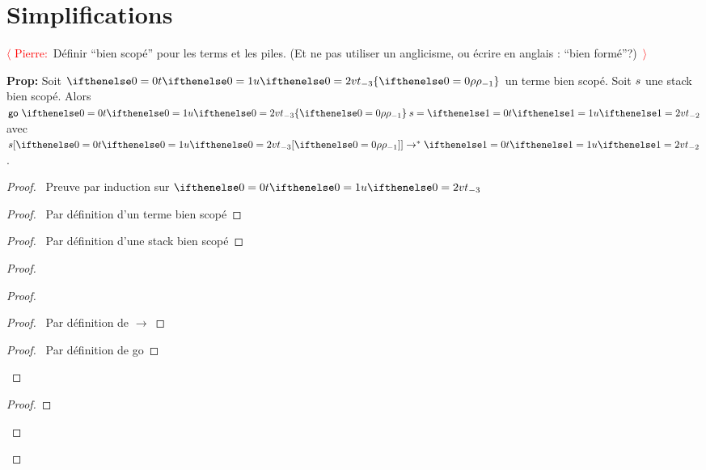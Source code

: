 \documentclass[a4paper]{article}
\newcommand{\TODO}[1]{\textcolor{red}{$\langle$ Pierre:}~#1\textcolor{red}{~$\rangle$}}
\begin{document}
\section{Simplifications}

\TODO{Définir ``bien scopé'' pour les terms et les piles. (Et ne pas utiliser un anglicisme, ou écrire en anglais : ``bien formé''?)}

\textbf{Prop:}
Soit $\scoped \aTerm \env$ un terme bien scopé. Soit $s$ une stack bien scopé.
Alors $\go {\scoped \aTerm \env} \aStack = \aTerm[1]$ avec $\stackapp \aStack {\subs \aTerm \env} \to^* \aTerm[1]$.
\begin{proof}
  \pfsketch\ Preuve par induction sur $\aTerm$
  \prove{$\stackapp \aStack {\subs \aTerm \env} \to^* \go {\scoped \aTerm \env} \aStack$ }
  \begin{proof}
    \pf\ Par définition d'un terme bien scopé
  \end{proof}
  \begin{proof}
    \pf\ Par définition d'une stack bien scopé
  \end{proof}
  \begin{proof}
    \begin{proof}
      \begin{proof}
        \pf\ Par définition de $\to$
      \end{proof}
      \begin{proof}
        \pf\ Par définition de \textsf{go}
      \end{proof}
    \end{proof}
    \begin{proof}

\end{proof}
\end{proof}
\end{proof}
\end{document}
